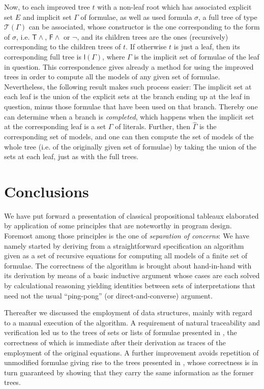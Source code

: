 \documentclass[a4paper,UKenglish]{lipics}
\newcounter{c}
\newcommand{\lmods}[1]{\ensuremath{\hat{#1}}}
\newcommand{\ruleq}[1]{\ensuremath{\mathsf{#1}}}
\newcommand{\ttabl}[1]{\ensuremath{\mathcal{T}({#1})}}
\begin{document}
Now, to each improved tree $t$ with a non-leaf root which has associated explicit set $E$ and implicit set $\Gamma$ of formulae, as well as used formula $\sigma$, a full tree of type \ttabl{\Gamma} can be associated, whose constructor is the one corresponding to the form of $\sigma$, i.e. \ruleq{T\wedge}, \ruleq{F\wedge} or \ruleq{\neg}, and its children trees are the ones (recursively) corresponding to the children trees of $t$.
If otherwise $t$ is just a leaf, then its corresponding full tree is $\ruleq{l}(\Gamma)$, where $\Gamma$ is the implicit set of formulae of the leaf in question.
This correspondence gives already a method for using the improved trees in order to compute all the models of any given set of formulae. Nevertheless, the following result makes such process easier:
The implicit set at each leaf is the union of the explicit sets at the branch ending up at the leaf in question, minus those formulae that have been used on that branch.
Thereby one can determine when a branch is \emph{completed}, which happens when the implicit set at the corresponding leaf is a set $\Gamma$ of literals. Further, then \lmods{\Gamma} is the corresponding set of models, and one can then compute the set of models of the whole tree (i.e. of the originally given set of formulae) by taking the union of the sets at each leaf, just as with the full trees.

\section{Conclusions}
We have put forward a presentation of classical propositional tableaux elaborated by application of some principles that are noteworthy in program design. Foremost among those principles is the one of \emph{separation of concerns}: We have namely started by deriving from a straightforward specification an algorithm given as a set of recursive equations for computing all models of a finite set of formulae. The correctness of the algorithm is brought about hand-in-hand with its derivation by means of a basic inductive argument whose cases are each solved by calculational reasoning yielding identities between sets of interpretations that need not the usual ``ping-pong'' (or direct-and-converse) argument.

Thereafter we discussed the employment of data structures, mainly with regard to a manual execution of the algorithm. A requirement of natural traceability and verification led us to the trees of sets or lists of formulae presented in \cite{Hintikka,Ben-Ari}, the correctness of which is immediate after their derivation as traces of the employment of the original equations. A further improvement avoids repetition of unmodified formulae giving rise to the trees presented in \cite{Smullyan}, whose correctness is in turn guaranteed by showing that they carry the same information as the former trees.
\end{document}
